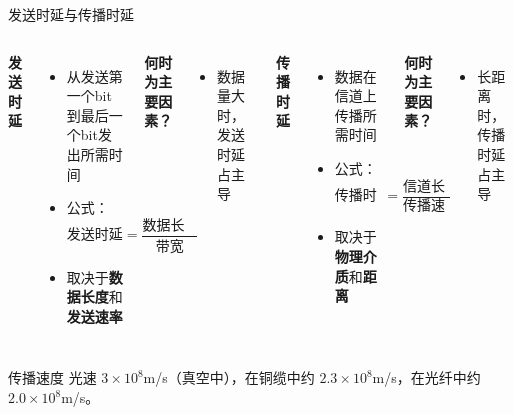 \documentclass[10pt, aspectratio=169]{beamer}
\begin{document}
\begin{frame}{发送时延与传播时延}
    \begin{columns}[T]
        \textbf{发送时延}
        \begin{itemize}
            \item 从发送第一个bit到最后一个bit发出所需时间
            \item 公式：
            $$\text{发送时延} = \frac{\text{数据长度}}{\text{带宽}}$$
            \item 取决于\textbf{数据长度}和\textbf{发送速率}
        \end{itemize}
        \vspace{0.5em}
        \textbf{何时为主要因素？}
        \begin{itemize}
            \item 数据量大时，发送时延占主导
        \end{itemize}
        \textbf{传播时延}
        \begin{itemize}
            \item 数据在信道上传播所需时间
            \item 公式：
            $$\text{传播时延} = \frac{\text{信道长度}}{\text{传播速度}}$$
            \item 取决于\textbf{物理介质}和\textbf{距离}
        \end{itemize}
        \vspace{0.5em}
        \textbf{何时为主要因素？}
        \begin{itemize}
            \item 长距离时，传播时延占主导
        \end{itemize}
    \end{columns}
    \vspace{0.3em}
    \begin{block}{传播速度}
        光速 $3\times10^8$m/s（真空中），在铜缆中约 $2.3\times10^8$m/s，在光纤中约 $2.0\times10^8$m/s。
    \end{block}
\end{frame}
\end{document}
